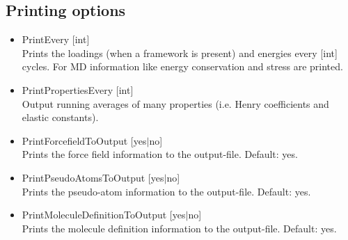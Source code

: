 \subsection*{Printing options}
\begin{itemize}
\item{PrintEvery [int]}\\
Prints the loadings (when a framework is present) and energies every [int] cycles. For MD information
like energy conservation and stress are printed.
\item{PrintPropertiesEvery [int]}\\
Output running averages of many properties (i.e. Henry coefficients and elastic constants).
\item{PrintForcefieldToOutput [yes$|$no]}\\
Prints the force field information to the output-file.
Default: yes.
\item{PrintPseudoAtomsToOutput [yes$|$no]}\\
Prints the pseudo-atom information to the output-file.
Default: yes.
\item{PrintMoleculeDefinitionToOutput [yes$|$no]}\\
Prints the molecule definition information to the output-file.
Default: yes.
\end{itemize}

